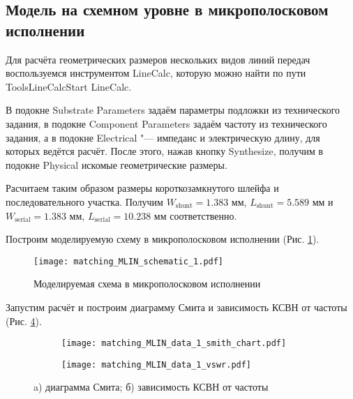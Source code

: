 \subsection{Модель на схемном уровне в микрополосковом исполнении}

Для расчёта геометрических размеров нескольких видов линий передач воспользуемся инструментом LineCalc, которую можно найти по пути Tools\textrightarrow LineCalc\textrightarrow Start LineCalc.

В подокне Substrate Parameters задаём параметры подложки из технического задания, в подокне Component Parameters задаём частоту из технического задания, а в подокне Electrical "--- импеданс и электрическую длину, для которых ведётся расчёт.
После этого, нажав кнопку Synthesize, получим в подокне Physical искомые геометрические размеры.

Расчитаем таким образом размеры короткозамкнутого шлейфа и последовательного участка.
Получим $W_\text{shunt} = 1.383 \text{~мм}$, $L_\text{shunt} = 5.589 \text{~мм}$ и $W_\text{serial} = 1.383 \text{~мм}$, $L_\text{serial} = 10.238 \text{~мм}$ соответственно.

Построим моделируемую схему в микрополосковом исполнении (Рис. \ref{fig:matching_MLIN_schematic_1}).

\begin{figure}[!ht]
    \centering
    \texttt{[image: matching\_MLIN\_schematic\_1.pdf]}
    \caption{Моделируемая схема в микрополосковом исполнении}
    \label{fig:matching_MLIN_schematic_1}
\end{figure}

Запустим расчёт и построим диаграмму Смита и зависимость КСВН от частоты (Рис. \ref{fig:matching_MLIN_data_display_1}).

\begin{figure}[!ht]
    \begin{subfigure}[b]{0.45\textwidth}
        \centering
        \texttt{[image: matching\_MLIN\_data\_1\_smith\_chart.pdf]}
        \caption{}
        \label{fig:matching_MLIN_data_1_smith_chart}
    \end{subfigure}
    \hfill
    \begin{subfigure}[b]{0.45\textwidth}
        \centering
        \texttt{[image: matching\_MLIN\_data\_1\_vswr.pdf]}
        \caption{}
        \label{fig:matching_MLIN_data_1_vswr}
    \end{subfigure}
    \caption{
        a) диаграмма Смита;
        б) зависимость КСВН от частоты
    }
    \label{fig:matching_MLIN_data_display_1}
\end{figure}

